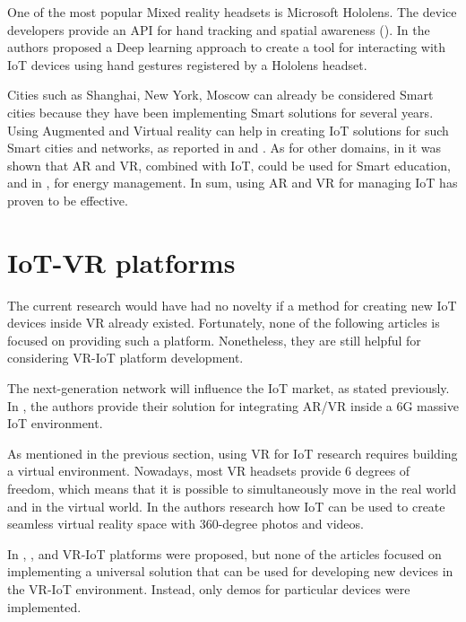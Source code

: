 One of the most popular Mixed reality headsets is Microsoft Hololens. The device developers provide an API for hand tracking and spatial awareness (\cite{MRTK2021}). In \cite{sun_magichand_2019} the authors proposed a Deep learning approach to create a tool for interacting with IoT devices using hand gestures registered by a Hololens headset. 

Cities such as Shanghai, New York, Moscow can already be considered Smart cities because they have been implementing Smart solutions for several years. Using Augmented and Virtual reality can help in creating IoT solutions for such Smart cities and networks, as reported in \cite{chakareski_uav-iot_2019} and \cite{carneiro_bim_2018}. As for other domains, in \cite{paul_role_2019} it was shown that AR and VR, combined with IoT, could be used for Smart education, and in \cite{jang_building_2019-1}, for energy management. In sum, using AR and VR for managing IoT has proven to be effective.

\section{IoT-VR platforms}

The current research would have had no novelty if a method for creating new IoT devices inside VR already existed. Fortunately, none of the following articles is focused on providing such a platform. Nonetheless, they are still helpful for considering VR-IoT platform development.

The next-generation network will influence the IoT market, as stated previously. In \cite{liao_information-centric_2021}, the authors provide their solution for integrating AR/VR inside a 6G massive IoT environment.

As mentioned in the previous section, using VR for IoT research requires building a virtual environment. Nowadays, most VR headsets provide 6 degrees of freedom, which means that it is possible to simultaneously move in the real world and in the virtual world. In \cite{you_internet_2018} the authors research how IoT can be used to create seamless virtual reality space with 360-degree photos and videos.

In \cite{myeong-in_choi_design_2017}, \cite{simiscuka_synchronisation_2018}, \cite{simiscuka_real-virtual_2019} and \cite{krishnan_performance_2020} VR-IoT platforms were proposed, but none of the articles focused on implementing a universal solution that can be used for developing new devices in the VR-IoT environment. Instead, only demos for particular devices were implemented.

